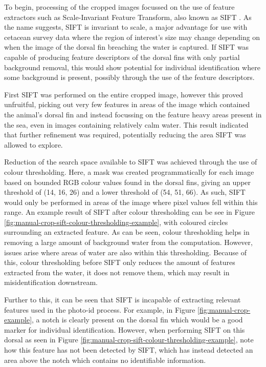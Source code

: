 To begin, processing of the cropped images focussed on the use of feature extractors such as Scale-Invariant Feature Transform, also known as SIFT \cite{lowe_object_1999}. As the name suggests, SIFT is invariant to scale, a major advantage for use with cetacean survey data where the region of interest's size may change depending on when the image of the dorsal fin breaching the water is captured. If SIFT was capable of producing feature descriptors of the dorsal fins with only partial background removal, this would show potential for individual identification where some background is present, possibly through the use of the feature descriptors. 

First SIFT was performed on the entire cropped image, however this proved unfruitful, picking out very few features in areas of the image which contained the animal's dorsal fin and instead focussing on the feature heavy areas present in the sea, even in images containing relatively calm water. This result indicated that further refinement was required, potentially reducing the area SIFT was allowed to explore. 

Reduction of the search space available to SIFT was achieved through the use of colour thresholding. Here, a mask was created programmatically for each image based on bounded RGB colour values found in the dorsal fins, giving an upper threshold of (14, 16, 26) and a lower threshold of (54, 51, 66). As such, SIFT would only be performed in areas of the image where pixel values fell within this range. An example result of SIFT after colour thresholding can be see in Figure \ref{fig:manual-crop-sift-colour-thresholding-example}, with coloured circles surrounding an extracted feature. As can be seen, colour thresholding helps in removing a large amount of background water from the computation. However, issues arise where areas of water are also within this thresholding. Because of this, colour thresholding before SIFT only reduces the amount of features extracted from the water, it does not remove them, which may result in misidentification downstream.

Further to this, it can be seen that SIFT is incapable of extracting relevant features used in the photo-id process. For example, in Figure \ref{fig:manual-crop-example}, a notch is clearly present on the dorsal fin which would be a good marker for individual identification. However, when performing SIFT on this dorsal as seen in Figure \ref{fig:manual-crop-sift-colour-thresholding-example}, note how this feature has not been detected by SIFT, which has instead detected an area above the notch which contains no identifiable information. 

